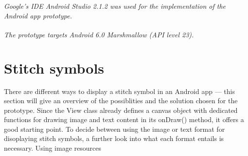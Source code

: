 \textit{Google’s IDE Android Studio 2.1.2 was used for the implementation of the Android app prototype.}
\\
\\
\textit{The prototype targets Android 6.0 Marshmallow (\gls{API} level 23).}

\section{Stitch symbols}
There are different ways to display a stitch symbol in an Android app --- this section will give an overview of the possiblities and the solution chosen for the prototype. 
Since the View class already defines a canvas object with dedicated functions for drawing image and text content in its onDraw() method, it offers a good starting point. To decide between using the image or text format for disoplaying stitch symbols, a further look into what each format entails is necessary. Using image resources 

